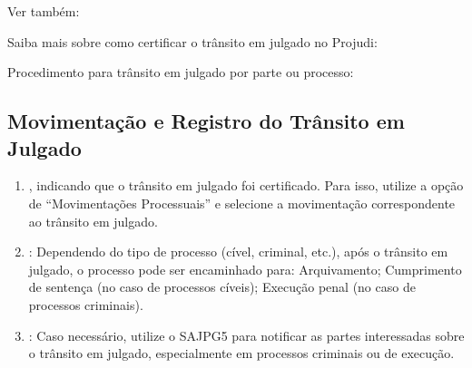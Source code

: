 \documentclass[letterpaper,10pt,brazil]{sphinxmanual}
\begin{document}
\begin{sphinxseealso}{Ver também:}

\sphinxAtStartPar
Saiba mais sobre como certificar o trânsito em julgado no Projudi:

\sphinxAtStartPar
Procedimento para trânsito em julgado por parte ou processo: {\hyperref[\detokenize{projud_40_transitaremjulgado::doc}]{}}


\end{sphinxseealso}



\subsection{Movimentação e Registro do Trânsito em Julgado}
\label{\detokenize{09certificartransito:movimentacao-e-registro-do-transito-em-julgado}}\begin{enumerate}
%
\item {} 
\sphinxAtStartPar
{}, indicando que o trânsito em julgado foi certificado. Para isso, utilize a opção de “Movimentações Processuais” e selecione a movimentação correspondente ao trânsito em julgado.

\item {} 
\sphinxAtStartPar
{}: Dependendo do tipo de processo (cível, criminal, etc.), após o trânsito em julgado, o processo pode ser encaminhado para:
\sphinxhyphen{} Arquivamento;
\sphinxhyphen{} Cumprimento de sentença (no caso de processos cíveis);
\sphinxhyphen{} Execução penal (no caso de processos criminais).

\item {} 
\sphinxAtStartPar
{}: Caso necessário, utilize o SAJPG5 para notificar as partes interessadas sobre o trânsito em julgado, especialmente em processos criminais ou de execução.

\end{enumerate}
\end{document}

